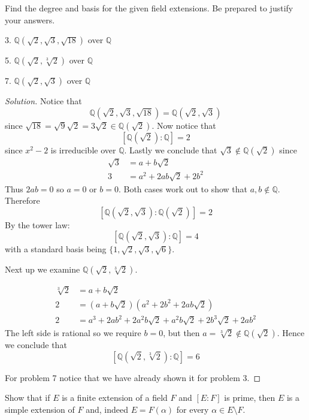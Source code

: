 \begin{prob}
    Find the degree and basis for the given field extensions. 
    Be prepared to justify your answers. 

    3. $\mathbb Q(\sqrt 2, \sqrt 3, \sqrt{18})$ over $\mathbb Q$ 

    5. $\mathbb Q(\sqrt 2, \sqrt[3]2)$ over $\mathbb Q$ 

    7. $\mathbb Q(\sqrt 2, \sqrt 3)$ over $\mathbb Q$
\end{prob}
\begin{proof}[Solution]
    Notice that 
    \[
        \mathbb Q(\sqrt 2, \sqrt 3, \sqrt{18}) 
        = \mathbb Q(\sqrt 2, \sqrt 3)
    \]
    since $\sqrt{18} = \sqrt{9}\sqrt 2 = 3 \sqrt 2 \in \mathbb 
    Q(\sqrt 2)$.
    Now notice that 
    \[
        [\mathbb Q(\sqrt 2) : \mathbb Q] = 2 
    \]
    since $x^2 - 2$ is irreducible over $\mathbb Q$.
    Lastly we conclude that $\sqrt 3 \not \in \mathbb Q(\sqrt 2)$ 
    since 
    \begin{align*}
        \sqrt 3 &= a + b\sqrt 2 \\ 
        3 &= a^2 + 2ab\sqrt 2 + 2b^2
    \end{align*}
    Thus $2ab = 0$ so $a = 0$ or $b = 0$. Both cases work out 
    to show that $a,b \not\in \mathbb Q$. Therefore 
    \[
        [\mathbb Q(\sqrt 2, \sqrt 3) : \mathbb Q(\sqrt 2)] = 2
    \]
    By the tower law: 
    \[
        [\mathbb Q(\sqrt 2, \sqrt 3) : \mathbb Q] = 4
    \]
    with a standard basis being 
    $\{1,\sqrt 2, \sqrt 3, \sqrt 6\}$.

    Next up we examine $\mathbb Q(\sqrt 2, \sqrt[3] 2)$.

    \begin{align*}
        \sqrt[3]2 &= a + b\sqrt 2 \\ 
        2 &= (a+b\sqrt 2)(a^2 + 2b^2 + 2ab\sqrt 2) \\ 
        2 &= a^3 + 2ab^2 + 2a^2b\sqrt 2 + a^2b\sqrt 2 + 
        2b^3 \sqrt 2 + 2ab^2
    \end{align*}
    The left side is rational so we require $b = 0$, but then 
    $a = \sqrt[3] 2 \not\in \mathbb Q(\sqrt 2)$. Hence we conclude 
    that 
    \[
        [\mathbb Q(\sqrt 2, \sqrt[3]2) : \mathbb Q] = 6
    \]

    For problem 7 notice that we have already shown it for 
    problem 3.
\end{proof}
\begin{prob}
    Show that if $E$ is a finite extension of a field 
    $F$ and $[E:F]$ is prime, then $E$ is a simple 
    extension of $F$ and, indeed $E = F(\alpha)$ for 
    every $\alpha \in E\setminus F$.
\end{prob}
